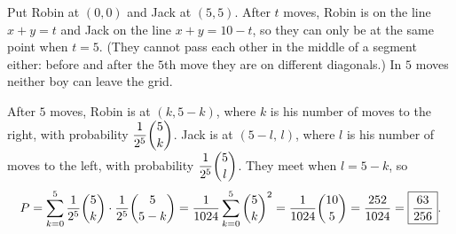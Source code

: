 Put Robin at $(0,0)$ and Jack at $(5,5)$. After $t$ moves, Robin is on the line $x+y=t$ and Jack on the line $x+y=10-t$, so they can only be at the same point when $t=5$. (They cannot pass each other in the middle of a segment either: before and after the $5$th move they are on different diagonals.) In $5$ moves neither boy can leave the grid.

After $5$ moves, Robin is at $(k,5-k)$, where $k$ is his number of moves to the right, with probability $\dfrac{1}{2^5}\dbinom5k$. Jack is at $(5-l,\,l)$, where $l$ is his number of moves to the left, with probability $\dfrac{1}{2^5}\dbinom5l$. They meet when $l=5-k$, so
\[P=\sum_{k=0}^{5}\dfrac{1}{2^5}\dbinom5k\cdot\dfrac{1}{2^5}\dbinom{5}{5-k}=\dfrac{1}{1024}\sum_{k=0}^5\dbinom5k^2=\dfrac{1}{1024}\dbinom{10}{5}=\dfrac{252}{1024}=\boxed{\dfrac{63}{256}}.\]
